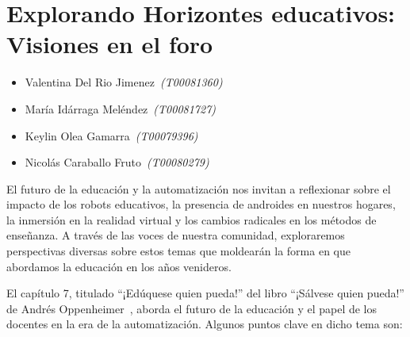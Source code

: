 \documentclass[letterpaper, 12pt]{article}
\newcommand{\liderValentina}{Valentina Del Rio Jimenez~}
\newcommand{\memberMaria}{María Idárraga Meléndez~}
\newcommand{\memberKeys}{Keylin Olea Gamarra~}
\newcommand{\memberNicolas}{Nicolás Caraballo Fruto~}
\begin{document}
\section*{Explorando Horizontes educativos: Visiones en el foro}

\noindent\makebox[\linewidth]{\rule{\textwidth}{0.4pt}}

\begin{itemize}[label=$\diamond$]
      \item \liderValentina\textit{(T00081360)}
      \item \memberMaria\textit{(T00081727)}
      \item \memberKeys\textit{(T00079396)}
      \item \memberNicolas\textit{(T00080279)}
\end{itemize}

\noindent\makebox[\linewidth]{\rule{\textwidth}{0.4pt}}

\nocite{reference_book}
\nocite{capacitar_trabajadores}
\nocite{Soledad}
\nocite{Parra_2022}
\nocite{Unir_2023}


El futuro de la educación y la automatización nos invitan a
reflexionar sobre el impacto de los robots educativos, la
presencia de androides en nuestros hogares, la inmersión en
la realidad virtual y los cambios radicales en los métodos
de enseñanza. A través de las voces de nuestra comunidad,
exploraremos perspectivas diversas sobre estos temas que
moldearán la forma en que abordamos la educación en los
años venideros.


El capítulo 7, titulado ``¡Edúquese quien pueda!'' del
libro ``¡Sálvese quien pueda!'' de Andrés
Oppenheimer~\cite{reference_book}, aborda el futuro de la
educación y el papel de los docentes en la era de la
automatización. Algunos puntos clave en dicho tema son:
\end{document}
